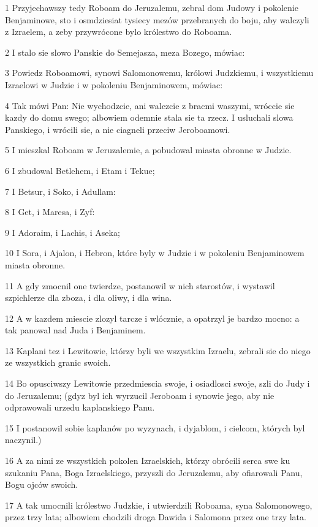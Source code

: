 \par 1 Przyjechawszy tedy Roboam do Jeruzalemu, zebral dom Judowy i pokolenie Benjaminowe, sto i osmdziesiat tysiecy mezów przebranych do boju, aby walczyli z Izraelem, a zeby przywrócone bylo królestwo do Roboama.
\par 2 I stalo sie slowo Panskie do Semejasza, meza Bozego, mówiac:
\par 3 Powiedz Roboamowi, synowi Salomonowemu, królowi Judzkiemu, i wszystkiemu Izraelowi w Judzie i w pokoleniu Benjaminowem, mówiac:
\par 4 Tak mówi Pan: Nie wychodzcie, ani walczcie z bracmi waszymi, wróccie sie kazdy do domu swego; albowiem odemnie stala sie ta rzecz. I usluchali slowa Panskiego, i wrócili sie, a nie ciagneli przeciw Jeroboamowi.
\par 5 I mieszkal Roboam w Jeruzalemie, a pobudowal miasta obronne w Judzie.
\par 6 I zbudowal Betlehem, i Etam i Tekue;
\par 7 I Betsur, i Soko, i Adullam:
\par 8 I Get, i Maresa, i Zyf:
\par 9 I Adoraim, i Lachis, i Aseka;
\par 10 I Sora, i Ajalon, i Hebron, które byly w Judzie i w pokoleniu Benjaminowem miasta obronne.
\par 11 A gdy zmocnil one twierdze, postanowil w nich starostów, i wystawil szpichlerze dla zboza, i dla oliwy, i dla wina.
\par 12 A w kazdem miescie zlozyl tarcze i wlócznie, a opatrzyl je bardzo mocno: a tak panowal nad Juda i Benjaminem.
\par 13 Kaplani tez i Lewitowie, którzy byli we wszystkim Izraelu, zebrali sie do niego ze wszystkich granic swoich.
\par 14 Bo opusciwszy Lewitowie przedmiescia swoje, i osiadlosci swoje, szli do Judy i do Jeruzalemu; (gdyz byl ich wyrzucil Jeroboam i synowie jego, aby nie odprawowali urzedu kaplanskiego Panu.
\par 15 I postanowil sobie kaplanów po wyzynach, i dyjablom, i cielcom, których byl naczynil.)
\par 16 A za nimi ze wszystkich pokolen Izraelskich, którzy obrócili serca swe ku szukaniu Pana, Boga Izraelskiego, przyszli do Jeruzalemu, aby ofiarowali Panu, Bogu ojców swoich.
\par 17 A tak umocnili królestwo Judzkie, i utwierdzili Roboama, syna Salomonowego, przez trzy lata; albowiem chodzili droga Dawida i Salomona przez one trzy lata.
